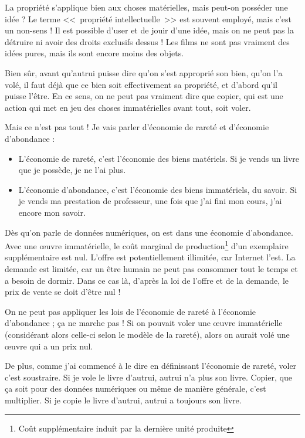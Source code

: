 La propriété s'applique bien aux choses matérielles, mais peut-on posséder une idée ?
Le terme <<~propriété intellectuelle~>> est souvent employé, mais c'est un non-sens !
Il est possible d'user et de jouir d'une idée, mais on ne peut pas la détruire ni avoir des droits exclusifs dessus !
Les films ne sont pas vraiment des idées pures, mais ils sont encore moins des objets.

Bien sûr, avant qu'autrui puisse dire qu'on s'est approprié son bien, qu'on l'a volé, il faut déjà que ce bien soit effectivement sa propriété, et d'abord qu'il puisse l'être.
En ce sens, on ne peut pas vraiment dire que copier, qui est une action qui met en jeu des choses immatérielles avant tout, soit voler.

Mais ce n'est pas tout !
Je vais parler d'économie de rareté et d'économie d'abondance :

\begin{itemize}
\item L'économie de rareté, c'est l'économie des biens matériels.
Si je vends un livre que je possède, je ne l'ai plus.
\item L'économie d'abondance, c'est l'économie des biens immatériels, du savoir.
Si je vends ma prestation de professeur, une fois que j'ai fini mon cours, j'ai encore mon savoir.
\end{itemize}

Dès qu'on parle de données numériques, on est dans une économie d'abondance.
Avec une œuvre immatérielle, le coût marginal de production\footnote{Coût supplémentaire induit par la dernière unité produite} d'un exemplaire supplémentaire est nul.
L'offre est potentiellement illimitée, car Internet l'est.
La demande est limitée, car un être humain ne peut pas consommer tout le temps et a besoin de dormir.
Dans ce cas là, d'après la loi de l'offre et de la demande, le prix de vente se doit d'être nul !

On ne peut pas appliquer les lois de l'économie de rareté à l'économie d'abondance ; ça ne marche pas !
Si on pouvait voler une œuvre immatérielle (considérant alors celle-ci selon le modèle de la rareté), alors on aurait volé une œuvre qui a un prix nul.

De plus, comme j'ai commencé à le dire en définissant l'économie de rareté, voler c'est soustraire.
Si je vole le livre d'autrui, autrui n'a plus son livre.
Copier, que ça soit pour des données numériques ou même de manière générale, c'est multiplier.
Si je copie le livre d'autrui, autrui a toujours son livre.

